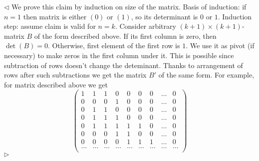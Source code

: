 \documentclass[12pt]{article}
\newenvironment{solution}{\par $\triangleleft$}{$\triangleright$}
\begin{document}
\begin{solution}
    We prove this claim by induction on size of the matrix. Basis of induction:
    if $n=1$ then matrix is either $(0)$ or $(1)$, so its determinant is $0$ or
    $1$. Induction step: assume claim is valid for $n=k$. Consider arbitrary
    $(k+1)\times(k+1)$-matrix $B$ of the form described above. If its first
    column is zero, then $\det(B)=0$. Otherwise, first element of the first row
    is $1$. We use it as pivot (if necessary) to make zeros in the first column
    under it. This is possible since subtraction of rows doesn't change the
    deteminant. Thanks to arrangement of rows after such subtractions we get the
    matrix $B'$ of the same form. For example, for matrix described above we get
    $$
        \begin{pmatrix}
            1      &
            1      &
            1      &
            0      &
            0      &
            0      &
            0      &
            \ldots &
            0        \\
            0      &
            0      &
            0      &
            1      &
            0      &
            0      &
            0      &
            \ldots &
            0        \\
            0      &
            1      &
            1      &
            0      &
            0      &
            0      &
            0      &
            \ldots &
            0        \\
            0      &
            1      &
            1      &
            1      &
            0      &
            0      &
            0      &
            \ldots &
            0        \\
            0      &
            1      &
            1      &
            1      &
            1      &
            1      &
            0      &
            \ldots &
            0        \\
            0      &
            0      &
            0      &
            1      &
            1      &
            0      &
            0      &
            \ldots &
            0        \\
            0      &
            0      &
            0      &
            0      &
            1      &
            1      &
            1      &
            \ldots &
            0        \\
            \ldots &
            \ldots &
            \ldots &
            \ldots &
            \ldots &
            \ldots &
            \ldots &
            \ldots &
            \ldots   \\

\end{pmatrix}$$
\end{solution}
\end{document}
